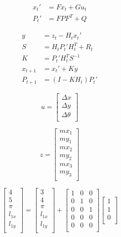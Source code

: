 \documentclass[11pt]{report}
\begin{document}
\begin{align*}
    x_t' &= F x_t + G u_t \\
    P_t' &= F P F^T + Q
\end{align*}

\begin{align*}
    y &= z_t - H_t x_t' \\
    S &= H_t P_t' H^T_t + R_t \\
    K &= P_t' H^T_t S^{-1} \\
    x_{t+1} &= x_t' + Ky \\
    P_{t+1} &= (I - K H_t) P_t'
\end{align*}

$$
u = 
\begin{bmatrix}
    \Delta x \\
    \Delta y \\
    \Delta \theta \\
\end{bmatrix}
$$

$$
z = 
\begin{bmatrix}
    mx_1 \\
    my_1 \\
    mx_2 \\
    my_2 \\
    mx_3 \\
    my_3 \\
\end{bmatrix}
$$

$$
\begin{bmatrix}
    4 \\
    5 \\
    \pi \\
    l_{1x} \\
    l_{1y} \\
\end{bmatrix}
=
\begin{bmatrix}
    3 \\
    4 \\
    \pi  \\
    l_{1x} \\
    l_{1y} \\
\end{bmatrix}
+
\begin{bmatrix}
    1 & 0 & 0  \\
    0 & 1 & 0  \\
    0 & 0 & 1  \\
    0 & 0 & 0  \\
    0 & 0 & 0  \\
\end{bmatrix}
\begin{bmatrix}
    1 \\
    1 \\
    0 \\
\end{bmatrix}
$$
\end{document}
